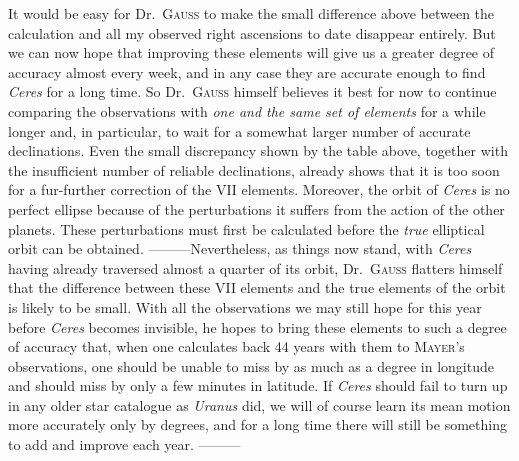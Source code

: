 It would be easy for Dr.\ \textsc{Gauss} to make the small difference above between the calculation and all my observed right ascensions to date disappear entirely. But we can now hope that improving these elements will give us a greater degree of accuracy almost every week, and in any case they are accurate enough to find \textit{Ceres} for a long time. So Dr.\ \textsc{Gauss} himself believes it best for now to continue comparing the observations with \textit{one and the same set of elements} for a while longer and, in particular, to wait for a somewhat larger number of accurate declinations. Even the small discrepancy shown by the table above, together with the insufficient number of reliable declinations, already shows that it is too soon for a fur-further correction of the VII elements. Moreover, the orbit of \textit{Ceres} is no perfect ellipse because of the perturbations it suffers from the action of the other planets. These perturbations must first be calculated before the \textit{true} elliptical orbit can be obtained. —\quad —\quad —\quad Nevertheless, as things now stand, with \textit{Ceres} having already traversed almost a quarter of its orbit, Dr.\ \textsc{Gauss} flatters himself that the difference between these VII elements and the true elements of the orbit is likely to be small. With all the observations we may still hope for this year before \textit{Ceres} becomes invisible, he hopes to bring these elements to such a degree of accuracy that, when one calculates back 44 years with them to \textsc{Mayer}'s observations, one should be unable to miss by as much as a degree in longitude and should miss by only a few minutes in latitude. If \textit{Ceres} should fail to turn up in any older star catalogue as \textit{Uranus} did, we will of course learn its mean motion more accurately only by degrees, and for a long time there will still be something to add and improve each year. —\quad —\quad —

